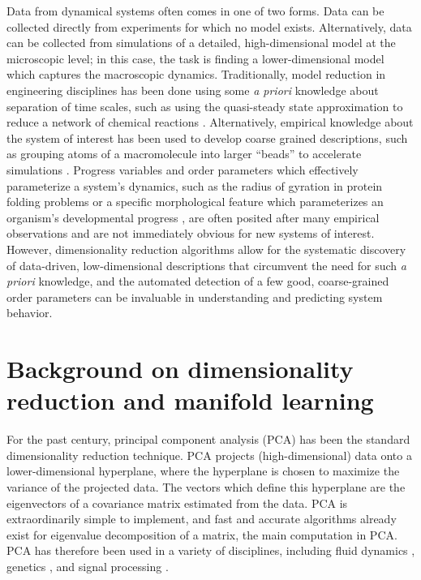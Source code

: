 Data from dynamical systems often comes in one of two forms. 
%
Data can be collected directly from experiments for which no model exists. 
%
Alternatively, data can be collected from simulations of a detailed, high-dimensional model at the microscopic level; in this case, the task is finding a lower-dimensional model which captures the macroscopic dynamics. 
%
Traditionally, model reduction in engineering disciplines has been done using some {\em a priori} knowledge about separation of time scales,
such as using the quasi-steady state approximation to reduce a network of chemical reactions \cite{bowen1963singular}.
%
Alternatively, empirical knowledge about the system of interest has been used to develop coarse grained descriptions, such as grouping atoms of a macromolecule into larger ``beads'' to accelerate simulations \cite{izvekov2005systematic, monticelli2008martini, saunders2013coarse, spiga2013electrostatic}.
%
Progress variables and order parameters which effectively parameterize a system's dynamics, such as the radius of gyration in protein folding problems \cite{lazaridis1997new, kim2015systematic} or a specific morphological feature which parameterizes an organism's developmental progress \cite{dubuis2013accurate, hamaratoglu2011dpp}, are often posited after many empirical observations and are not immediately obvious for new systems of interest. 
%
However, dimensionality reduction algorithms allow for the systematic discovery of data-driven, low-dimensional descriptions that circumvent the need for such {\em a priori} knowledge, and the automated detection of a few good, coarse-grained
order parameters can be invaluable in understanding and predicting system behavior.
%


\section{Background on dimensionality reduction and manifold learning} \label{sec:background}


For the past century, principal component analysis (PCA) \cite{shlens2005tutorial} has been the standard dimensionality reduction technique.
%
PCA projects (high-dimensional) data onto a lower-dimensional hyperplane, where the hyperplane is chosen to maximize the variance of the projected data. 
%
The vectors which define this hyperplane are the eigenvectors of a covariance matrix estimated from the data. 
%
PCA is extraordinarily simple to implement, and fast and accurate algorithms already exist for eigenvalue decomposition of a matrix, the main computation in PCA.
%
PCA has therefore been used in a variety of disciplines, including fluid dynamics \cite{rowley2004model, kunisch2002galerkin}, genetics \cite{alter2000singular, troyanskaya2001missing}, and signal processing \cite{vaseghi2008advanced}. 

